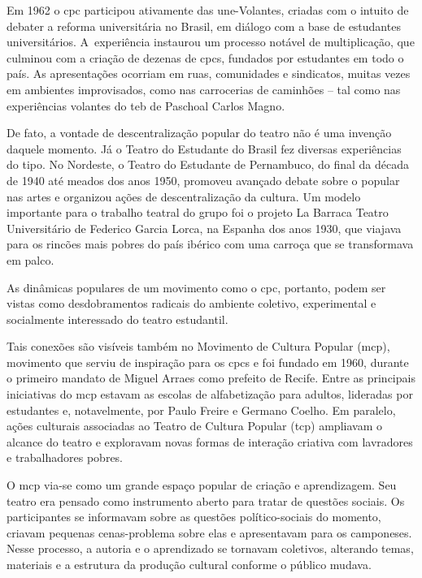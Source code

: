 {Em 1962 o {\sc cpc} participou ativamente das {\sc une}-Volantes, criadas com o
intuito de debater a reforma universitária no Brasil, em diálogo com a
base de estudantes universitários. A~experiência instaurou um processo
notável de multiplicação, que culminou com a criação de dezenas de {\sc cpc}s,
fundados por estudantes em todo o país. As apresentações ocorriam em
ruas, comunidades e sindicatos, muitas vezes em ambientes improvisados,
como nas carrocerias de caminhões -- tal como nas experiências volantes
do {\sc teb} de Paschoal Carlos Magno.

De fato, a vontade de descentralização popular do teatro não é uma
invenção daquele momento. Já o Teatro do Estudante do Brasil fez
diversas experiências do tipo. No Nordeste, o Teatro do Estudante de
Pernambuco, do final da década de 1940 até meados dos anos 1950,
promoveu avançado debate sobre o popular nas artes e organizou ações de
descentralização da cultura. Um modelo importante para o trabalho
teatral do grupo foi o projeto La Barraca Teatro Universitário de
Federico Garcia Lorca, na Espanha dos anos 1930, que viajava para os
rincões mais pobres do país ibérico com uma carroça que se transformava
em palco.

As dinâmicas populares de um movimento como o {\sc cpc}, portanto, podem ser
vistas como desdobramentos radicais do ambiente coletivo, experimental e
socialmente interessado do teatro estudantil.

Tais conexões são visíveis também no Movimento de Cultura Popular
({\sc mcp}), movimento que serviu de inspiração para os {\sc cpc}s e foi fundado em
1960, durante o primeiro mandato de Miguel Arraes como prefeito de
Recife. Entre as principais iniciativas do {\sc mcp} estavam as escolas de
alfabetização para adultos, lideradas por estudantes e, notavelmente,
por Paulo Freire e Germano Coelho. Em paralelo, ações culturais
associadas ao Teatro de Cultura Popular ({\sc tcp}) ampliavam o alcance do
teatro e exploravam novas formas de interação criativa com lavradores e
trabalhadores pobres.

O {\sc mcp} via-se como um grande espaço popular de criação e aprendizagem.
Seu teatro era pensado como instrumento aberto para tratar de questões
sociais. Os participantes se informavam sobre as questões
político-sociais do momento, criavam pequenas cenas-problema sobre elas
e apresentavam para os camponeses. Nesse processo, a autoria e o
aprendizado se tornavam coletivos, alterando temas, materiais e a
estrutura da produção cultural conforme o público mudava.

}
